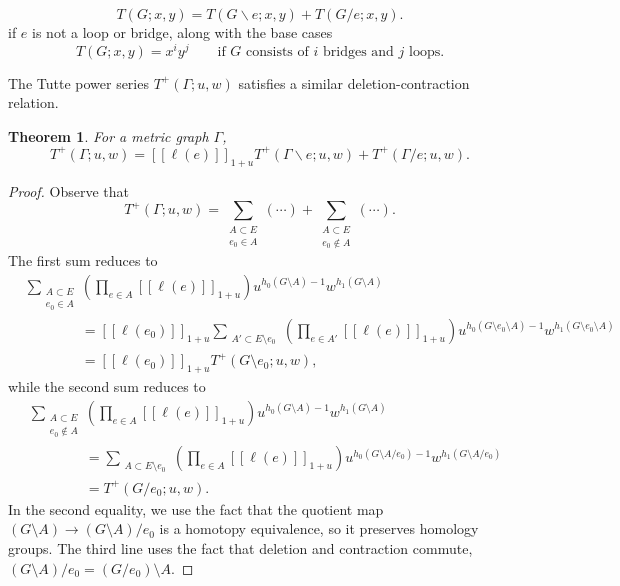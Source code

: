 \documentclass{amsart}
\newtheorem{thm}{Theorem}
\theoremstyle{definition}
\newcommand{\fanalog}[2]{[\![#2]\!]_{#1}}
\begin{document}
\begin{equation*}
T(G;x,y) = T(G \backslash e; x,y) + T(G / e; x,y).
\end{equation*}
if $e$ is not a loop or bridge,
along with the base cases 
\begin{equation*}
T(G; x,y) = x^i y^j \qquad\text{if $G$ consists of $i$ bridges and $j$ loops.}
\end{equation*}

The Tutte power series $T^+(\Gamma; u,w)$ satisfies a similar deletion-contraction relation.

\begin{thm}
For a metric graph $\Gamma$,
\begin{equation}
T^+(\Gamma; u,w) = \fanalog{1 + u}{\ell(e)} T^+(\Gamma \backslash e; u,w) + T^+(\Gamma / e; u,w) .
\end{equation}
\end{thm}

\begin{proof}
Observe that
\[
	T^+(\Gamma; u,w) = \sum_{\substack{A \subset E \\ e_0 \in A}} (\cdots) + \sum_{\substack{A \subset E \\ e_0 \not \in A}} (\cdots).
\]
The first sum reduces to
\begin{align*}
	&\sum_{\substack{A \subset E \\ e_0 \in A}} \left( \prod_{e \in A} \fanalog{1+u}{\ell(e)} \right) u^{h_0(G\setminus A)-1}w^{h_1(G\setminus A)}\\
	&\qquad\qquad = \fanalog{1+u}{\ell(e_0)} \sum_{\substack{A' \subset E \setminus e_0}} \left( \prod_{e \in A'}\fanalog{1+u}{\ell(e)} \right) u^{h_0(G\setminus e_0\setminus A)-1}w^{h_1(G\setminus e_0\setminus A)} \\[1.5em]
	&\qquad\qquad = \fanalog{1+u}{\ell(e_0)} T^+(G\setminus e_0;u,w),
\end{align*}
while the second sum reduces to
\begin{align*}
	&\sum_{\substack{A \subset E \\ e_0 \not\in A}} \left( \prod_{e \in A} \fanalog{1+u}{\ell(e)} \right) u^{h_0(G\setminus A)-1}w^{h_1(G\setminus A)}\\
	&\qquad\qquad = \sum_{\substack{A \subset E \setminus e_0}} \left( \prod_{e \in A} \fanalog{1+u}{\ell(e)} \right) u^{h_0(G \setminus A / e_0)-1}w^{h_1(G\setminus A / e_0)} \\[1.5em]
	&\qquad\qquad = T^+(G/ e_0;u,w).
\end{align*}
In the second equality, we use the fact that the quotient map $(G\setminus A) \to (G\setminus A)/e_0$ is a homotopy equivalence, so it preserves homology groups. The third line uses the fact that deletion and contraction commute, $(G \setminus A) / e_0 = (G / e_0) \setminus A$.
\end{proof}
\end{document}
